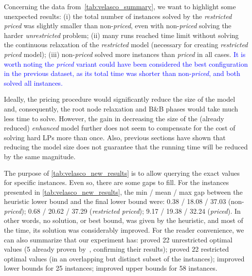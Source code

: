 \documentclass[smallextended]{svjour3}       %
\newif\iffinalversion
\newcommand{\newtext}[1]{\iffinalversion%
#1%
\else%
\textcolor{blue}{#1}%
\fi%
}
\begin{document}
Concerning the data from~\autoref{tab:velasco_summary}, we want to highlight some unexpected results:
(i) the total number of instances solved by the \emph{restricted priced} was slightly smaller than non-\emph{priced}, even with non-\emph{priced} solving the harder \emph{unrestricted} problem;
(ii) many runs reached time limit without solving the continuous relaxation of the \emph{restricted} model (necessary for creating \emph{restricted priced} model);
(iii) non-\emph{priced} solved more instances than \emph{priced} in all cases.
\newtext{It is worth noting the \emph{priced} variant could have been considered the best configuration in the previous dataset, as its total time was shorter than non-\emph{priced}, and both solved all instances.}
Ideally, the pricing procedure would significantly reduce the size of the model and, consequently, the root node relaxation and B\&B phases would take much less time to solve.
However, the gain in decreasing the size of the (already reduced) \emph{enhanced} model further does not seem to compensate for the cost of solving hard LPs more than once.
Also, previous sections have shown that reducing the model size does not guarantee that the running time will be reduced by the same magnitude.

The purpose of \autoref{tab:velasco_new_results} is to allow querying the exact values for specific instances.
Even so, there are some gaps to fill.
For the instances presented in \autoref{tab:velasco_new_results},
the min / mean / max gap between the heuristic lower bound and the final lower bound were: 0.38 / 18.08 / 37.03 (non-\emph{priced}); 0.68 / 20.62 / 37.29 (\emph{restricted priced}); 9.17 / 19.38 / 32.24 (\emph{priced}).
In other words, no solution, or best bound, was given by the heuristic, and most of the time, its solution was considerably improved.
For the reader convenience, we can also summarize that our experiment has:
proved 22 unrestricted optimal values (5 already proven by~\cite{velasco:2019}, confirming their results);
proved 22 restricted optimal values (in an overlapping but distinct subset of the instances);
improved lower bounds for 25 instances;
improved upper bounds for 58 instances.
\end{document}
